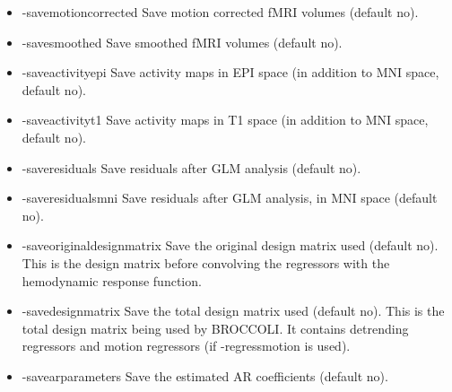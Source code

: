 \begin{itemize}
\item -savemotioncorrected       
\newline \newline Save motion corrected fMRI volumes (default no). 

\item -savesmoothed              
\newline \newline Save smoothed fMRI volumes (default no). 

\newpage

\item -saveactivityepi           
\newline \newline Save activity maps in EPI space \newline (in addition to MNI space, default no). 

\item -saveactivityt1            
\newline \newline Save activity maps in T1 space \newline (in addition to MNI space, default no). 

\item -saveresiduals             
\newline \newline Save residuals after GLM analysis (default no). 

\item -saveresidualsmni          
\newline \newline Save residuals after GLM analysis, in MNI space (default no). 

\item -saveoriginaldesignmatrix  
\newline \newline Save the original design matrix used (default no). This is the design matrix before convolving the regressors with the hemodynamic response function.

\item -savedesignmatrix          
\newline \newline Save the total design matrix used (default no). This is the total design matrix being used by BROCCOLI. It contains detrending regressors and motion regressors (if -regressmotion is used).

\item -savearparameters          
\newline \newline Save the estimated AR coefficients (default no). 


\end{itemize}
